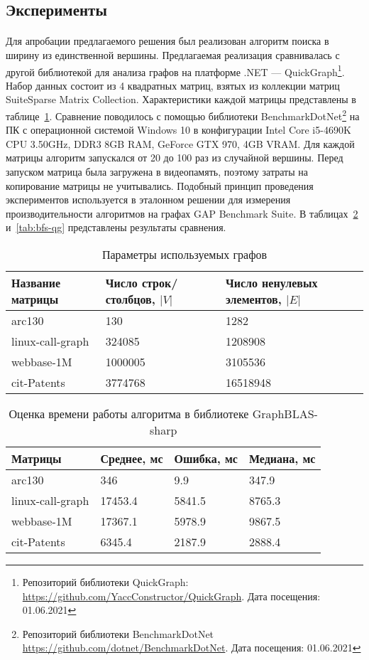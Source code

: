 \subsection{Эксперименты}
\paragraph{}
Для апробации предлагаемого решения был реализован алгоритм поиска в ширину из единственной вершины. Предлагаемая реализация сравнивалась с другой библиотекой для анализа графов на платформе .NET --- QuickGraph\footnote{Репозиторий библиотеки QuickGraph: \url{https://github.com/YaccConstructor/QuickGraph}. Дата посещения: 01.06.2021}. Набор данных состоит из 4 квадратных матриц, взятых из коллекции матриц SuiteSparse Matrix Collection\cite{matcol}. Характеристики каждой матрицы представлены в таблице~\ref{tab:dataset}. Сравнение поводилось с помощью библиотеки BenchmarkDotNet\footnote{Репозиторий библиотеки BenchmarkDotNet \url{https://github.com/dotnet/BenchmarkDotNet}. Дата посещения: 01.06.2021} на ПК с операционной системой Windows 10 в конфигурации Intel Core i5-4690K CPU 3.50GHz, DDR3 8GB RAM, GeForce GTX 970, 4GB VRAM. Для каждой матрицы алгоритм запускался от 20 до 100 раз из случайной вершины. Перед запуском матрица была загружена в видеопамять, поэтому затраты на копирование матрицы не учитывались. Подобный принцип проведения экспериментов используется в эталонном решении для измерения производительности алгоритмов на графах GAP Benchmark Suite\cite{gap}.
В таблицах~\ref{tab:bfs-gb} и~\ref{tab:bfs-qg} представлены результаты сравнения.

\begin{table}[h]
    \begin{tabularx}{\textwidth}{|X|X|X|}
      \hline
      Название матрицы & Число строк/столбцов, $|V|$ & Число ненулевых элементов, $|E|$\\
      \hline
      arc130 & 130 & 1282 \\
      linux-call-graph & 324085 & 1208908\\
      webbase-1M & 1000005 & 3105536 \\
      cit-Patents & 3774768 & 16518948 \\ 
      \hline
    \end{tabularx}
  \caption{Параметры используемых графов}
  \label{tab:dataset}
\end{table}

\begin{table}[h]
    \begin{tabularx}{\textwidth}{|X|X|X|X|}
      \hline
      Матрицы & Среднее, мс & Ошибка, мс & Медиана, мс \\
      \hline
      arc130 & 346 & 9.9 & 347.9 \\
      linux-call-graph & 17453.4 & 5841.5 & 8765.3 \\
      webbase-1M & 17367.1 & 5978.9 & 9867.5 \\
      cit-Patents & 6345.4 & 2187.9 & 2888.4 \\ 
      \hline
    \end{tabularx}
  \caption{Оценка времени работы алгоритма в библиотеке GraphBLAS-sharp}
  \label{tab:bfs-gb}
\end{table}

